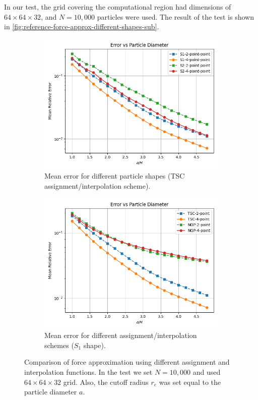 In our test, the grid covering the computational region had dimensions of $64\times 64\times 32$, and $N=10{,}000$ particles were used.
The result of the test is shown in \autoref{fig:reference-force-approx-different-shapes-sub}.
\begin{figure}[!ht]
    \centering
    \begin{subfigure}[b]{0.48\textwidth}
        \centering
        \includegraphics[width=\textwidth]{chapters/p3m-method/img/err_vs_part_diam_p3m.png}
        \caption{Mean error for different particle shapes (TSC assignment/interpolation scheme).}
        \label{fig:reference-force-approx-different-shapes-sub}
    \end{subfigure}
    \hfill
    \begin{subfigure}[b]{0.48\textwidth}
        \centering
        \includegraphics[width=\textwidth]{chapters/p3m-method/img/no-cic.png}
        \caption{Mean error for different assignment/interpolation schemes ($S_1$ shape).}
        \label{fig:reference-force-error-different-schemes-sub}
    \end{subfigure}
    \caption{Comparison of \PThreeM{} force approximation using different assignment and interpolation functions.
    In the test we set $N=10{,}000$ and used $64\times 64\times 32$ grid.
    Also, the cutoff radius $r_e$ was set equal to the particle diameter $a$.
    }
    \label{fig:p3m-global-err-combined}
\end{figure}
